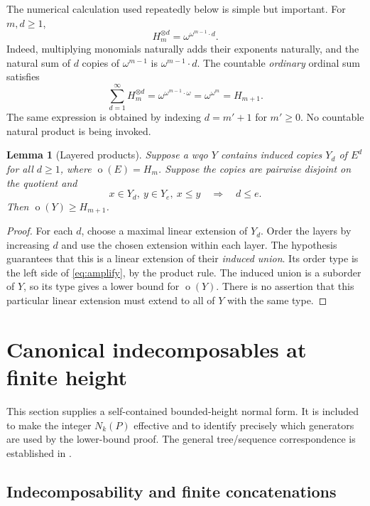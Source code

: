 \documentclass[11pt,letterpaper]{article}
\newtheorem{lemma}[lemma]{Lemma}
\theoremstyle{definition}
\theoremstyle{remark}
\newcommand{\otp}{\operatorname{o}}
\begin{document}
The numerical calculation used repeatedly below is simple but important.
For $m,d\ge1$,
\begin{equation}\label{eq:power}
  H_m^{\otimes d}=\omega^{\omega^{m-1}\cdot d}.
\end{equation}
Indeed, multiplying monomials naturally adds their exponents naturally,
and the natural sum of $d$ copies of $\omega^{m-1}$ is
$\omega^{m-1}\cdot d$. The countable \emph{ordinary} ordinal sum satisfies
\begin{equation}\label{eq:amplify}
  \sum_{d=1}^{\infty}H_m^{\otimes d}
  =\omega^{\omega^{m-1}\cdot\omega}
  =\omega^{\omega^m}=H_{m+1}.
\end{equation}
The same expression is obtained by indexing $d=m'+1$ for $m'\ge0$.
No countable natural product is being invoked.

\begin{lemma}[Layered products]\label{lem:layers}
Suppose a wqo $Y$ contains induced copies $Y_d$ of $E^d$ for all $d\ge1$,
where $\otp(E)=H_m$. Suppose the copies are pairwise disjoint on the
quotient and
\[
  x\in Y_d,\ y\in Y_e,\ x\le y\quad\Longrightarrow\quad d\le e.
\]
Then $\otp(Y)\ge H_{m+1}$.
\end{lemma}

\begin{proof}
For each $d$, choose a maximal linear extension of $Y_d$. Order the layers
by increasing $d$ and use the chosen extension within each layer.
The hypothesis guarantees that this is a linear extension of their
\emph{induced union}. Its order type is the left side of
\eqref{eq:amplify}, by the product rule. The induced union is a suborder of
$Y$, so its type gives a lower bound for $\otp(Y)$.
There is no assertion that this particular linear extension must extend
to all of $Y$ with the same type.
\end{proof}

\section{Canonical indecomposables at finite height}\label{sec:atoms}

This section supplies a self-contained bounded-height normal form.
It is included to make the integer $N_k(P)$ effective and to identify
precisely which generators are used by the lower-bound proof. The general
tree/sequence correspondence is established in \cite{ChopraPakhomov}.

\subsection{Indecomposability and finite concatenations}
\end{document}
